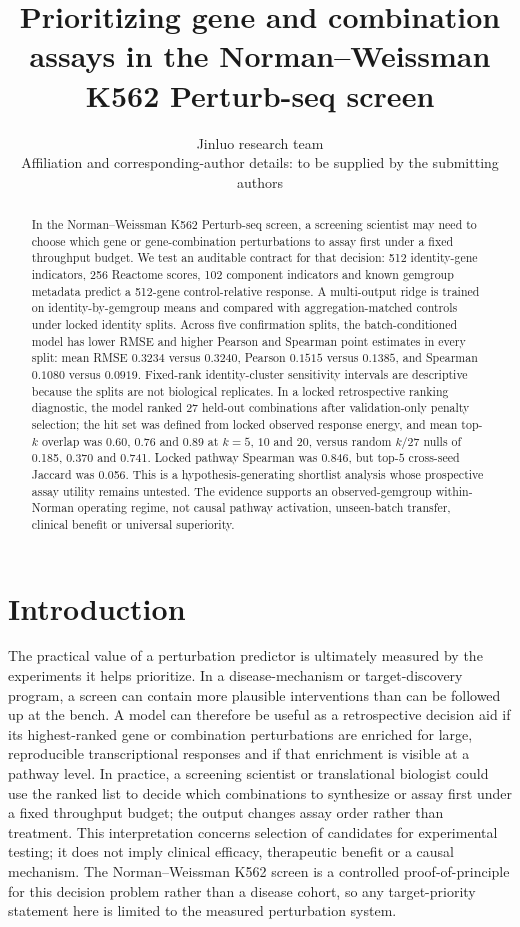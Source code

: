 \documentclass[10pt]{article}
\title{Prioritizing gene and combination assays in the Norman--Weissman K562 Perturb-seq screen}
\author{Jinluo research team\\
Affiliation and corresponding-author details: to be supplied by the submitting authors}
\date{}
\begin{document}
\maketitle

\begin{abstract}
In the Norman--Weissman K562 Perturb-seq screen, a screening scientist may need to choose which gene or gene-combination perturbations to assay first under a fixed throughput budget. We test an auditable contract for that decision: 512 identity-gene indicators, 256 Reactome scores, 102 component indicators and known gemgroup metadata predict a 512-gene control-relative response. A multi-output ridge is trained on identity-by-gemgroup means and compared with aggregation-matched controls under locked identity splits. Across five confirmation splits, the batch-conditioned model has lower RMSE and higher Pearson and Spearman point estimates in every split: mean RMSE $0.3234$ versus $0.3240$, Pearson $0.1515$ versus $0.1385$, and Spearman $0.1080$ versus $0.0919$. Fixed-rank identity-cluster sensitivity intervals are descriptive because the splits are not biological replicates. In a locked retrospective ranking diagnostic, the model ranked 27 held-out combinations after validation-only penalty selection; the hit set was defined from locked observed response energy, and mean top-$k$ overlap was 0.60, 0.76 and 0.89 at $k=5$, $10$ and $20$, versus random $k/27$ nulls of 0.185, 0.370 and 0.741. Locked pathway Spearman was 0.846, but top-$5$ cross-seed Jaccard was 0.056. This is a hypothesis-generating shortlist analysis whose prospective assay utility remains untested. The evidence supports an observed-gemgroup within-Norman operating regime, not causal pathway activation, unseen-batch transfer, clinical benefit or universal superiority.
\end{abstract}

\section{Introduction}
The practical value of a perturbation predictor is ultimately measured by the experiments it helps prioritize. In a disease-mechanism or target-discovery program, a screen can contain more plausible interventions than can be followed up at the bench. A model can therefore be useful as a retrospective decision aid if its highest-ranked gene or combination perturbations are enriched for large, reproducible transcriptional responses and if that enrichment is visible at a pathway level. In practice, a screening scientist or translational biologist could use the ranked list to decide which combinations to synthesize or assay first under a fixed throughput budget; the output changes assay order rather than treatment. This interpretation concerns selection of candidates for experimental testing; it does not imply clinical efficacy, therapeutic benefit or a causal mechanism. The Norman--Weissman K562 screen is a controlled proof-of-principle for this decision problem rather than a disease cohort, so any target-priority statement here is limited to the measured perturbation system.
\end{document}
